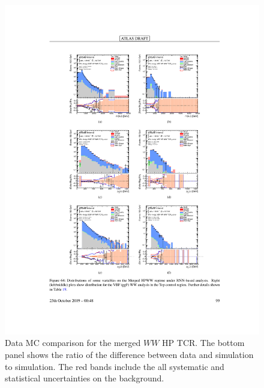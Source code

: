 \begin{figure}[htbp]
  \centering
  \includegraphics{figures/Analysis/datamc/merged_hp_ww_tcr.pdf}
    \caption{Data MC comparison for the merged $WW$ HP TCR. The bottom panel shows the ratio of the difference between data and simulation to simulation. The red bands include the all systematic and statistical uncertainties on the background. } 
  \label{fig:merged_hp_ww_TCR_datamc}
\end{figure} 
\FloatBarrier



